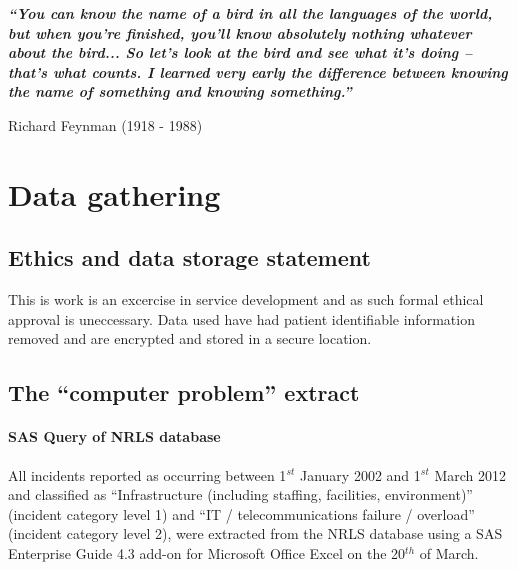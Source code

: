 \textbf{\textit{``You can know the name of a bird in all the languages of the world, but when you're finished, you'll know absolutely nothing whatever about the bird... So let's look at the bird and see what it's doing -- that's what counts. I learned very early the difference between knowing the name of something and knowing something.''}}

Richard Feynman (1918 - 1988) 

\chapter{Data gathering}

\section{Ethics and data storage statement}
This is work is an excercise in service development and as such formal ethical approval is uneccessary. Data used have had patient identifiable information removed and are encrypted and stored in a secure location. 

\section{The ``computer problem'' extract}

\subsubsection*{SAS Query of NRLS database}
All incidents reported as occurring between 1\ensuremath{^{st}} January 2002 and 1\ensuremath{^{st}} March 2012 and classified as ``Infrastructure (including staffing, facilities, environment)'' (incident category level 1) and ``IT / telecommunications failure / overload'' (incident category level 2), were extracted from the NRLS database using a SAS\textsuperscript{\textregistered} Enterprise Guide 4.3 add-on for Microsoft Office Excel\textsuperscript{\textregistered} on the 20\ensuremath{^{th}} of March.




